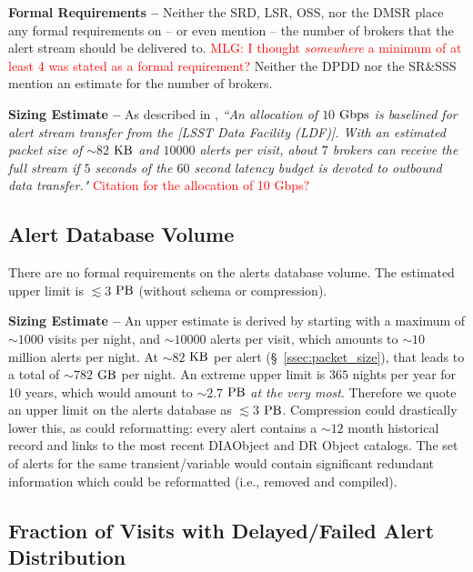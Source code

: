 \documentclass[DM,authoryear,toc]{lsstdoc}
\begin{document}
{\bf Formal Requirements --} Neither the SRD, LSR, OSS, nor the DMSR place any formal requirements on -- or even mention -- the number of brokers that the alert stream should be delivered to. \textcolor{red}{MLG: I thought {\it somewhere} a minimum of at least 4 was stated as a formal requirement?} Neither the DPDD nor the SR\&SSS mention an estimate for the number of brokers. 

{\bf Sizing Estimate --} As described in , {\it ``An allocation of $10$ $\rm Gbps$ is baselined for alert stream transfer from the [LSST Data Facility (LDF)]. With an estimated packet size of $\sim82$ $\rm KB$ and $10000$ alerts per visit, about $7$ brokers can receive the full stream if $5$ seconds of the $60$ second latency budget is devoted to outbound data transfer."} \textcolor{red}{Citation for the allocation of 10 Gbps?}


\subsection{Alert Database Volume}\label{ssec:adb_volume}

There are no formal requirements on the alerts database volume. The estimated upper limit is $\lesssim3$ $\rm PB$ (without schema or compression).

{\bf Sizing Estimate --} An upper estimate is derived by starting with a maximum of $\sim1000$ visits per night, and $\sim10000$ alerts per visit, which amounts to $\sim 10$ million alerts per night. At $\sim82$ $\rm KB$ per alert (\S~\ref{ssec:packet_size}), that leads to a total of $\sim782$ $\rm GB$ per night. An extreme upper limit is $365$ nights per year for 10 years, which would amount to $\sim2.7$ $\rm PB$ {\it at the very most}. Therefore we quote an upper limit on the alerts database as $\lesssim3$ $\rm PB$. Compression could drastically lower this, as could reformatting: every alert contains a $\sim12$ month historical record and links to the most recent DIAObject and DR Object catalogs. The set of alerts for the same transient/variable would contain significant redundant information which could be reformatted (i.e., removed and compiled).



\subsection{Fraction of Visits with Delayed/Failed Alert Distribution}\label{ssec:sciVisitAlertFailure}
\end{document}
